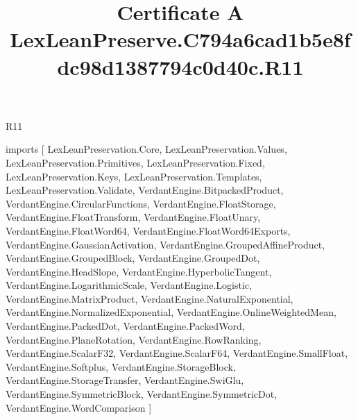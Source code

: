 \begin{lexlean}{R11}
\title{Certificate A LexLeanPreserve.C794a6cad1b5e8fdc98d1387794c0d40c.R11}
\begin{coremodule}
imports [
  LexLeanPreservation.Core,
  LexLeanPreservation.Values,
  LexLeanPreservation.Primitives,
  LexLeanPreservation.Fixed,
  LexLeanPreservation.Keys,
  LexLeanPreservation.Templates,
  LexLeanPreservation.Validate,
  VerdantEngine.BitpackedProduct,
  VerdantEngine.CircularFunctions,
  VerdantEngine.FloatStorage,
  VerdantEngine.FloatTransform,
  VerdantEngine.FloatUnary,
  VerdantEngine.FloatWord64,
  VerdantEngine.FloatWord64Exports,
  VerdantEngine.GaussianActivation,
  VerdantEngine.GroupedAffineProduct,
  VerdantEngine.GroupedBlock,
  VerdantEngine.GroupedDot,
  VerdantEngine.HeadSlope,
  VerdantEngine.HyperbolicTangent,
  VerdantEngine.LogarithmicScale,
  VerdantEngine.Logistic,
  VerdantEngine.MatrixProduct,
  VerdantEngine.NaturalExponential,
  VerdantEngine.NormalizedExponential,
  VerdantEngine.OnlineWeightedMean,
  VerdantEngine.PackedDot,
  VerdantEngine.PackedWord,
  VerdantEngine.PlaneRotation,
  VerdantEngine.RowRanking,
  VerdantEngine.ScalarF32,
  VerdantEngine.ScalarF64,
  VerdantEngine.SmallFloat,
  VerdantEngine.Softplus,
  VerdantEngine.StorageBlock,
  VerdantEngine.StorageTransfer,
  VerdantEngine.SwiGlu,
  VerdantEngine.SymmetricBlock,
  VerdantEngine.SymmetricDot,
  VerdantEngine.WordComparison
]


\end{coremodule}
\end{lexlean}
